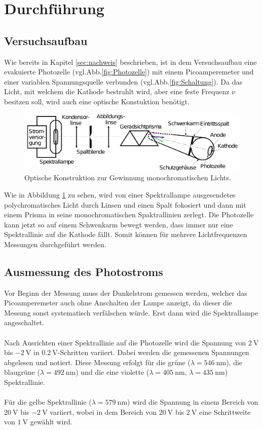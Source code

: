 \section{Durchführung}
\label{sec:Durchführung}

\subsection{Versuchsaufbau}
\label{sec:Aufbau}
Wie bereits in Kapitel \ref{sec:nachweis} beschrieben, ist in dem Versuchsaufbau eine evakuierte Photozelle (vgl.Abb.\ref{fig:Photozelle}) mit einem
Picoamperemeter und einer variablen Spannungsquelle verbunden (vgl.Abb.\ref{fig:Schaltung}). Da das Licht, mit welchem die Kathode 
bestrahlt wird, aber eine feste Frequenz $\nu$ besitzen soll, wird auch eine optische Konstuktion benötigt. 
\begin{figure}
    \centering
    \includegraphics[scale=0.3]{pictures/OptischerTeil.png}
    \caption{Optische Konstruktion zur Gewinnung monochromatischen Lichts. \cite{AP01}}
    \label{fig:optisch}
\end{figure}
Wie in Abbildung \ref{fig:optisch} zu sehen, wird von einer 
Spektrallampe ausgesendetes polychromatisches Licht durch Linsen und einen Spalt fokosiert und dann mit einem Prisma in seine monochromatischen
Spaktrallinien zerlegt. Die Photozelle kann jetzt so auf einem Schwenkarm bewegt werden, dass immer nur eine Spektrallinie auf die Kathode
fällt. Somit können für mehrere Lichtfrequenzen Messungen durchgeführt werden. 

\subsection{Ausmessung des Photostroms}
\label{sec:ausmessen}
Vor Beginn der Messung muss der Dunkelstrom gemessen werden, welcher das Picoamperemeter auch ohne Anschalten der Lampe anzeigt, da dieser 
die Messung sonst systematisch verfälschen würde. Erst dann wird die Spektrallampe angeschaltet.
\\
\\
\noindent
Nach Ausrichten einer Spektrallinie auf die Photozelle wird die Spannung von $\SI{2}{\volt}$ bis 
$\SI{-2}{\volt}$ in $\SI{0.2}{\volt}$-Schritten variiert. Dabei werden die gemessenen Spannungen abgelesen und notiert. Diese Messung 
erfolgt für die grüne ($\lambda=\SI{546}{\nano\metre}$), die blaugrüne ($\lambda=\SI{492}{\nano\metre}$) und die eine violette 
($\lambda=\SI{405}{\nano\metre}$, $\lambda=\SI{435}{\nano\metre}$) Spektrallinie. 
\\
\\
\noindent
Für die gelbe Spektrallinie ($\lambda=\SI{579}{\nano\metre}$) wird die Spannung in einem Bereich von $\SI{20}{\volt}$ bis $\SI{-2}{\volt}$
variiert, wobei in dem Bereich von $\SI{20}{\volt}$ bis $\SI{2}{\volt}$ eine Schrittweite von $\SI{1}{\volt}$ gewählt wird. 